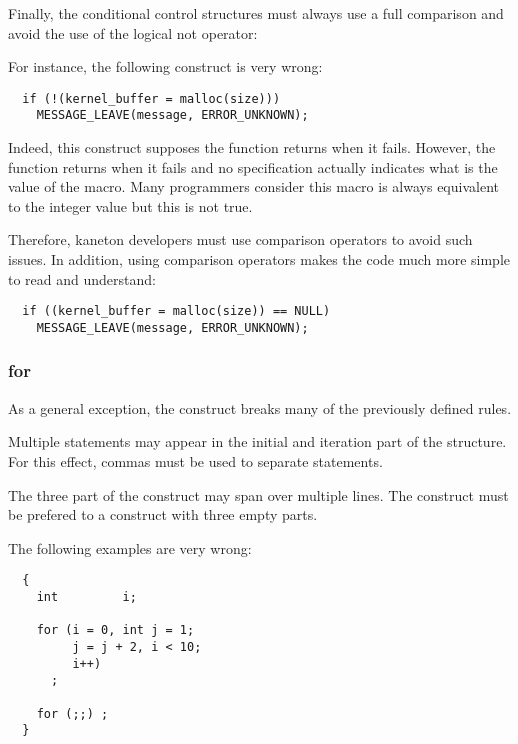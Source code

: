 Finally, the conditional control structures must always use a full
comparison and avoid the use of the logical not operator: \code{!}

For instance, the following construct is very wrong:

\begin{verbatim}
  if (!(kernel_buffer = malloc(size)))
    MESSAGE_LEAVE(message, ERROR_UNKNOWN);
\end{verbatim}

Indeed, this construct supposes the  function returns
 when it fails. However, the  function returns
 when it fails and no specification actually indicates what
is the value of the  macro. Many programmers consider this
macro is always equivalent to the  integer value but this is
not true.

Therefore, kaneton developers must use comparison operators to avoid such
issues. In addition, using comparison operators makes the code much
more simple to read and understand:

\begin{verbatim}
  if ((kernel_buffer = malloc(size)) == NULL)
    MESSAGE_LEAVE(message, ERROR_UNKNOWN);
\end{verbatim}


\subsubsection{for}

As a general exception, the  construct breaks many of the
previously defined rules.

Multiple statements may appear in the initial and iteration part of the
 structure. For this effect, commas must be used to separate
statements.

The three part of the  construct may span over multiple lines. The
 construct must be prefered to a  construct with
three empty parts.

The following examples are very wrong:

\begin{verbatim}
  {
    int         i;

    for (i = 0, int j = 1;
         j = j + 2, i < 10;
         i++)
      ;

    for (;;) ;
  }
\end{verbatim}

